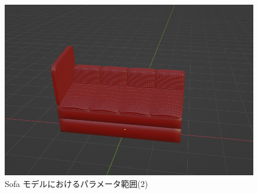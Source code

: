 \begin{figure}[h]
\begin{minipage}[b]{0.48\linewidth}
  \includegraphics[scale=0.17]{./imgs/sofaParamMean/1BaseMax.png}
 \end{minipage}
 \caption{Sofa モデルにおけるパラメータ範囲(2)}\label{fig:sofaParamMean_2}
\end{figure}


